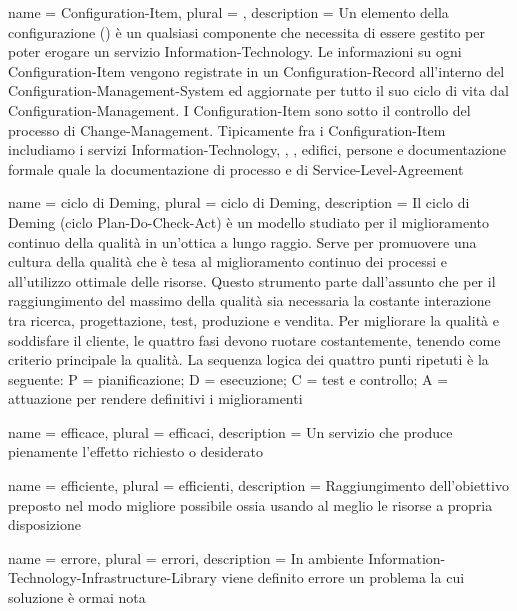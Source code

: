 %
%
{
	name		= {\acf{Configuration-Item}},
	plural		= {},
	description = {Un elemento della configurazione () è un qualsiasi componente che necessita di essere gestito per poter erogare un servizio \acs{Information-Technology}. Le informazioni su ogni \acs{Configuration-Item} vengono registrate in un \acf{Configuration-Record} all'interno del \acf{Configuration-Management-System} ed aggiornate per tutto il suo ciclo di vita dal \acf{Configuration-Management}. I \ac{Configuration-Item} sono sotto il controllo del processo di \acs{Change-Management}. Tipicamente fra i \ac{Configuration-Item} includiamo i servizi \acs{Information-Technology}, , , edifici, persone e documentazione formale quale la documentazione di processo e di \acf{Service-Level-Agreement}}
}

{
	name		= {ciclo di Deming},
	plural		= {ciclo di Deming},
	description = {Il ciclo di Deming (ciclo \acf{Plan-Do-Check-Act}) è un modello studiato per il miglioramento continuo della qualità in un'ottica a lungo raggio. Serve per promuovere una cultura della qualità che è tesa al miglioramento continuo dei processi e all'utilizzo ottimale delle risorse. Questo strumento parte dall'assunto che per il raggiungimento del massimo della qualità sia necessaria la costante interazione tra ricerca, progettazione, test, produzione e vendita. Per migliorare la qualità e soddisfare il cliente, le quattro fasi devono ruotare costantemente, tenendo come criterio principale la qualità. La sequenza logica dei quattro punti ripetuti è la seguente: P = pianificazione; D = esecuzione; C = test e controllo; A = attuazione per rendere definitivi i miglioramenti}
}

{
	name		= {efficace},
	plural		= {efficaci},
	description = {Un servizio che produce pienamente l'effetto richiesto o desiderato}
}

{
	name		= {efficiente},
	plural		= {efficienti},
	description = {Raggiungimento dell'obiettivo preposto nel modo migliore possibile ossia usando al meglio le risorse a propria disposizione}
}

{
	name		= {errore},
	plural		= {errori},
	description = {In ambiente \ac{Information-Technology-Infrastructure-Library} viene definito errore un problema la cui soluzione è ormai nota}
}

